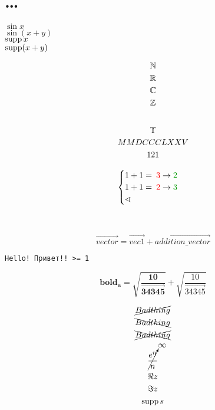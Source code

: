 \documentclass[12pt, a4paper]{article}
\begin{document}
    \section{…}

    $\sin x$\\
    $\sin(x+y)$\\
    $\operatorname{supp} x$\\
    $\operatorname{supp}(x+y)$

    \begin{gather}
        {\mathbb{N}} \\
        {\mathbb{R}} \\
        {\mathbb{C}} \\
        {\mathbb{Z}}
    \end{gather}

    \begin{equation}
        \label{eq:upsilon}
    \end{equation}

    \begin{gather}
        \Upsilon \\
        \RNumb{2875} \\
        \rm 121
    \end{gather}



    \begin{equation}
        \begin{cases}
            1+1=\correction{3}{2} \\
            1+1=\correction{2}{3} \\
            \sphericalangle 
        \end{cases}            
    \end{equation}

    \\



    \begin{equation}    
        \vec{vector} = \vec{vec1} + \vec{addition\_vector}
    \end{equation}    

    \texttt{Hello! Привет!! >= 1}

    \begin{equation}
        \bm{bold_a = \sqrt{\frac{10}{\vec{34345}}}} + \sqrt{\frac{10}{\vec{34345}}}
    \end{equation}


    \begin{gather}
        \cancel{Bad thing}\\
        \bcancel{Bad thing}\\
        \xcancel{Bad thing}\\    
        \cancelto{\infty}{\frac{e^n}{n}}\\
        \Re z \\
        \Im z \\
        \operatorname{supp} s
    \end{gather}
\end{document}
